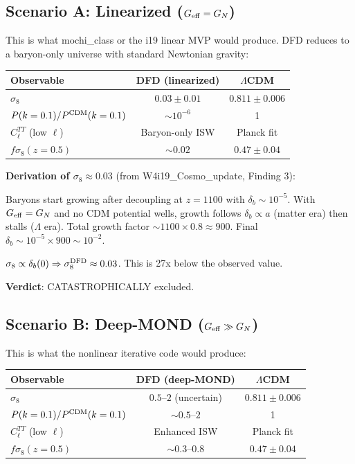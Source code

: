 \documentclass[11pt]{article}
\theoremstyle{definition}
\theoremstyle{remark}
\newcommand{\Geff}{G_{\rm eff}}
\newcommand{\LCDM}{$\Lambda$CDM}
\begin{document}
\subsection{Scenario A: Linearized ($\Geff = G_N$)}

This is what mochi\_class or the i19 linear MVP would produce.
DFD reduces to a baryon-only universe with standard Newtonian gravity:

\begin{center}
\begin{tabular}{lcc}
\toprule
Observable & DFD (linearized) & \LCDM \\
\midrule
$\sigma_8$ & $0.03 \pm 0.01$ & $0.811 \pm 0.006$ \\
$P(k=0.1)/P^{\rm CDM}(k=0.1)$ & $\sim 10^{-6}$ & 1 \\
$C_\ell^{TT}$ (low $\ell$) & Baryon-only ISW & Planck fit \\
$f\sigma_8(z=0.5)$ & $\sim 0.02$ & $0.47 \pm 0.04$ \\
\bottomrule
\end{tabular}
\end{center}

\textbf{Derivation of $\sigma_8 \approx 0.03$} (from W4i19\_Cosmo\_update,
Finding 3):

Baryons start growing after decoupling at $z = 1100$ with
$\delta_b \sim 10^{-5}$. With $\Geff = G_N$ and no CDM potential
wells, growth follows $\delta_b \propto a$ (matter era) then
stalls ($\Lambda$ era). Total growth factor $\sim 1100 \times 0.8
\approx 900$. Final $\delta_b \sim 10^{-5} \times 900 \sim 10^{-2}$.

$\sigma_8 \propto \delta_b(0) \Rightarrow \sigma_8^{\rm DFD}
\approx 0.03$. This is 27x below the observed value.

\textbf{Verdict}: CATASTROPHICALLY excluded.

\subsection{Scenario B: Deep-MOND ($\Geff \gg G_N$)}

This is what the nonlinear iterative code would produce:

\begin{center}
\begin{tabular}{lcc}
\toprule
Observable & DFD (deep-MOND) & \LCDM \\
\midrule
$\sigma_8$ & $0.5$--$2$ (uncertain) & $0.811 \pm 0.006$ \\
$P(k=0.1)/P^{\rm CDM}(k=0.1)$ & $\sim 0.5$--$2$ & 1 \\
$C_\ell^{TT}$ (low $\ell$) & Enhanced ISW & Planck fit \\
$f\sigma_8(z=0.5)$ & $\sim 0.3$--$0.8$ & $0.47 \pm 0.04$ \\
\bottomrule
\end{tabular}
\end{center}
\end{document}
